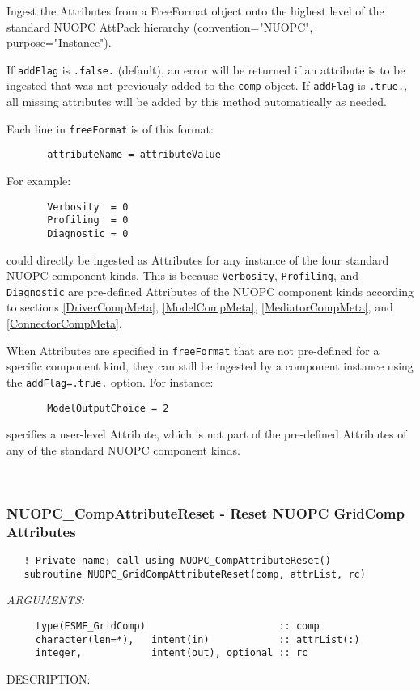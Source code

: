      Ingest the Attributes from a FreeFormat object onto the highest level
     of the standard NUOPC AttPack hierarchy (convention="NUOPC", 
     purpose="Instance").
   
     If {\tt addFlag} is {\tt .false.} (default), an error will be returned if 
     an attribute is to be ingested that was not previously added to the 
     {\tt comp} object. If {\tt addFlag} is {\tt .true.}, all missing attributes
     will be added by this method automatically as needed.
  
     Each line in {\tt freeFormat} is of this format:
  
     \begin{verbatim}
       attributeName = attributeValue
     \end{verbatim}
  
     For example:
     \begin{verbatim}
       Verbosity  = 0
       Profiling  = 0
       Diagnostic = 0
     \end{verbatim}
     could directly be ingested as Attributes for any instance of the four 
     standard NUOPC component kinds. This is because {\tt Verbosity},
     {\tt Profiling}, and {\tt Diagnostic} are pre-defined Attributes of the 
     NUOPC component kinds according to sections \ref{DriverCompMeta}, 
     \ref{ModelCompMeta}, \ref{MediatorCompMeta}, and \ref{ConnectorCompMeta}.
  
     When Attributes are specified in {\tt freeFormat} that are not pre-defined
     for a specific component kind, they can still be ingested by a component
     instance using the {\tt addFlag=.true.} option. For instance:
     \begin{verbatim}
       ModelOutputChoice = 2
     \end{verbatim}
     specifies a user-level Attribute, which is not part of the pre-defined 
     Attributes of any of the standard NUOPC component kinds.
   
 
\mbox{}\hrulefill\ 
 
\subsubsection [NUOPC\_CompAttributeReset] {NUOPC\_CompAttributeReset - Reset NUOPC GridComp Attributes}


\begin{verbatim}   ! Private name; call using NUOPC_CompAttributeReset() 
   subroutine NUOPC_GridCompAttributeReset(comp, attrList, rc)\end{verbatim}{\em ARGUMENTS:}
\begin{verbatim}     type(ESMF_GridComp)                       :: comp
     character(len=*),   intent(in)            :: attrList(:)
     integer,            intent(out), optional :: rc\end{verbatim}
{\sf DESCRIPTION:\\ }


